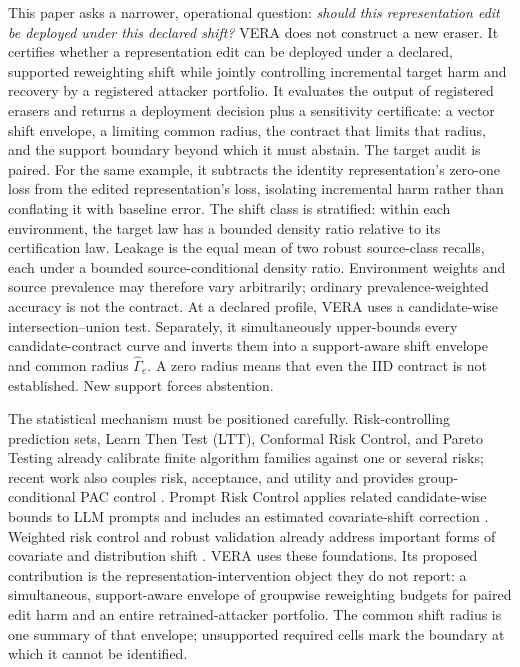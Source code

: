 This paper asks a narrower, operational question: \emph{should this
representation edit be deployed under this declared shift?} VERA does not
construct a new eraser. It certifies whether a representation edit can be
deployed under a declared, supported reweighting shift while jointly
controlling incremental target harm and recovery by a registered attacker
portfolio. It evaluates the output of registered erasers and
returns a deployment decision plus a sensitivity certificate: a vector shift
envelope, a limiting common radius, the contract that limits that radius, and
the support boundary beyond which it must abstain. The target audit is paired.
For the same example, it subtracts the identity representation's zero-one loss
from the edited representation's loss, isolating incremental harm rather than
conflating it with baseline error. The shift class is stratified: within each
environment, the target law has a bounded density ratio relative to its
certification law. Leakage is the equal mean of two robust source-class
recalls, each under a bounded source-conditional density ratio. Environment
weights and source prevalence may therefore vary arbitrarily; ordinary
prevalence-weighted accuracy is not the contract. At a declared profile, VERA
uses a candidate-wise intersection--union test. Separately, it simultaneously
upper-bounds every candidate-contract curve and inverts them into a
support-aware shift envelope and common radius $\widehat\Gamma_e$. A zero
radius means that even the IID contract is not established. New support forces
abstention.

The statistical mechanism must be positioned carefully. Risk-controlling
prediction sets, Learn Then Test (LTT), Conformal Risk Control, and Pareto
Testing already calibrate finite algorithm families against one or several
risks; recent work also couples risk, acceptance, and utility and provides
group-conditional PAC control
\cite{bates2021rcps,angelopoulos2025ltt,angelopoulos2024crc,laufer2023pareto,yu2026joint,huang2026conditional}.
Prompt Risk Control applies related candidate-wise bounds to LLM prompts and
includes an estimated covariate-shift correction \cite{zollo2024prompt}.
Weighted risk control and robust validation already address important forms of
covariate and distribution shift
\cite{tibshirani2019covariate,almeida2025hprc,zecchin2025wcrc,cauchois2024robust,ai2024finegrained}.
VERA uses these foundations. Its proposed contribution is the
representation-intervention object they do not report: a simultaneous,
support-aware envelope of groupwise reweighting budgets for paired edit harm
and an entire retrained-attacker portfolio. The common shift radius is one
summary of that envelope; unsupported required cells mark the boundary at which
it cannot be identified.

